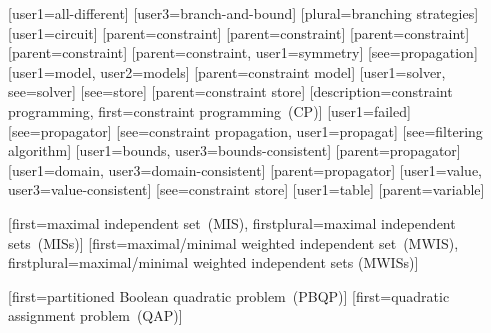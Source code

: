 [user1={all-different}]
[user3={branch-and-bound}]
[plural={branching strategies}]
[user1={circuit}]
[parent={constraint}]
[parent={constraint}]
[parent={constraint}]
[parent={constraint}]
%
        [parent={constraint}, user1={symmetry}]
[see={propagation}]
[user1={model}, user2={models}]
[parent={constraint model}]
[user1={solver}, see={solver}]
[see={store}]
[parent={constraint store}]
%
        [description={constraint programming},
         first={constraint programming~(CP)}]
[user1={failed}]
[see={propagator}]
[see={constraint propagation}, user1={propagat}]
[see={filtering algorithm}]
[user1={bounds}, user3={bounds-consistent}]
[parent={propagator}]
[user1={domain}, user3={domain-consistent}]
[parent={propagator}]
[user1={value}, user3={value-consistent}]
[see={constraint store}]
[user1={table}]
[parent={variable}]


%
        [first={maximal independent set~(MIS)},
         firstplural={maximal independent sets~(MISs)}]
%
        [first={maximal/minimal weighted independent set~(MWIS)},
         firstplural={maximal/minimal weighted independent sets (MWISs)}]

%
        [first={partitioned Boolean quadratic problem~(PBQP)}]
%
        [first={quadratic assignment problem~(QAP)}]

